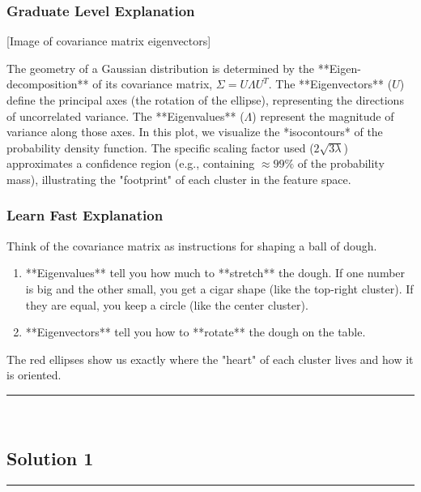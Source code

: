 \documentclass{article}
\begin{document}
\subsubsection*{Graduate Level Explanation}


[Image of covariance matrix eigenvectors]

The geometry of a Gaussian distribution is determined by the **Eigen-decomposition** of its covariance matrix, $\Sigma = U \Lambda U^T$.
The **Eigenvectors** ($U$) define the principal axes (the rotation of the ellipse), representing the directions of uncorrelated variance. The **Eigenvalues** ($\Lambda$) represent the magnitude of variance along those axes.
In this plot, we visualize the *isocontours* of the probability density function. The specific scaling factor used ($2\sqrt{3\lambda}$) approximates a confidence region (e.g., containing $\approx 99\%$ of the probability mass), illustrating the "footprint" of each cluster in the feature space.

\subsubsection*{Learn Fast Explanation}
Think of the covariance matrix as instructions for shaping a ball of dough.
\begin{enumerate}
    \item **Eigenvalues** tell you how much to **stretch** the dough. If one number is big and the other small, you get a cigar shape (like the top-right cluster). If they are equal, you keep a circle (like the center cluster).
    \item **Eigenvectors** tell you how to **rotate** the dough on the table.
\end{enumerate}
The red ellipses show us exactly where the "heart" of each cluster lives and how it is oriented.

\noindent\rule{\textwidth}{0.4pt}\\

\newpage

\subsection*{Solution 1}
\noindent\rule{\textwidth}{0.4pt}\\
\end{document}
